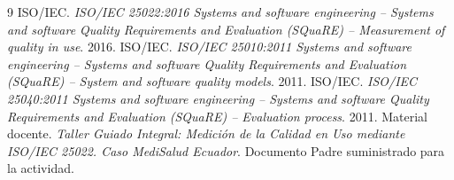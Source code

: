 \documentclass[11pt,letterpaper]{article}
\begin{document}

\tableofcontents
\clearpage
{}








\begin{thebibliography}{9}
 ISO/IEC. \textit{ISO/IEC 25022:2016 Systems and software engineering -- Systems and software Quality Requirements and Evaluation (SQuaRE) -- Measurement of quality in use}. 2016.
 ISO/IEC. \textit{ISO/IEC 25010:2011 Systems and software engineering -- Systems and software Quality Requirements and Evaluation (SQuaRE) -- System and software quality models}. 2011.
 ISO/IEC. \textit{ISO/IEC 25040:2011 Systems and software engineering -- Systems and software Quality Requirements and Evaluation (SQuaRE) -- Evaluation process}. 2011.
 Material docente. \textit{Taller Guiado Integral: Medición de la Calidad en Uso mediante ISO/IEC 25022. Caso MediSalud Ecuador}. Documento Padre suministrado para la actividad.
\end{thebibliography}

\appendix

\end{document}
